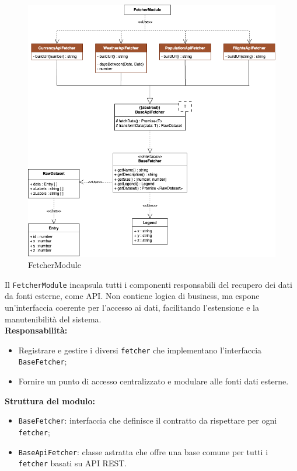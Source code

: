 \begin{figure}[H] 
    \centering
    \includegraphics[scale = 0.5]{template/images/uml_back/FetcherModule.png}
    \caption{FetcherModule}
\end{figure}

Il \texttt{FetcherModule} incapsula tutti i componenti responsabili del recupero dei dati da fonti esterne, come API. Non contiene logica di business, ma espone un'interfaccia coerente per l’accesso ai dati, facilitando l’estensione e la manutenibilità del sistema.\\

\textbf{Responsabilità:}
\begin{itemize}
    \item Registrare e gestire i diversi \texttt{fetcher} che implementano l’interfaccia \texttt{BaseFetcher};
    \item Fornire un punto di accesso centralizzato e modulare alle fonti dati esterne.
\end{itemize}

\textbf{Struttura del modulo:}
\begin{itemize}
    \item \texttt{BaseFetcher}: interfaccia che definisce il contratto da rispettare per ogni \texttt{fetcher};
    \item \texttt{BaseApiFetcher}: classe astratta che offre una base comune per tutti i \texttt{fetcher} basati su API REST.
\end{itemize}

